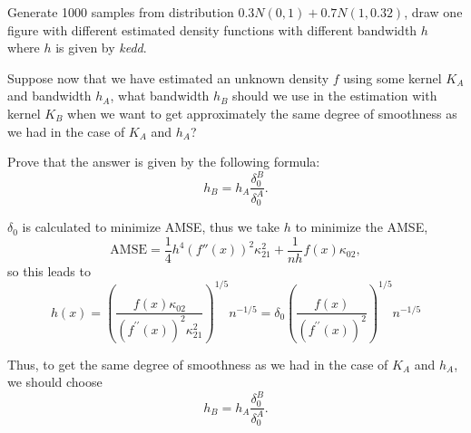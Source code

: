 \begin{problem}
    Generate 1000 samples from distribution $0.3N(0,1)+0.7N(1,0.32)$,  draw one figure with different estimated density functions with different bandwidth $h$ where $h$ is given by \emph{kedd}.
\end{problem}

\begin{problem}
    Suppose now that we have estimated an unknown density $f$ using some kernel $K_A$ and bandwidth $h_A$, what bandwidth $h_B$ should we use in the estimation with kernel $K_B$ when we want to get approximately the same degree of smoothness as we had in the case of $K_A$ and $h_A$?

    Prove that the answer is given by the following formula:
    \begin{equation*}
        h_B = h_A \frac{\delta_0^B}{\delta_0^A}.
    \end{equation*}
\end{problem}
\begin{solution}
    $\delta_0$ is calculated to minimize AMSE, thus we take $h$ to minimize the AMSE, 
    \begin{equation*}
        \text{AMSE} = \frac{1}{4}h^4 (f''(x))^2 \kappa_{21}^2 + \frac{1}{nh} f(x) \kappa_{02}, %
    \end{equation*}
    so this leads to 
    \begin{equation*}
        h(x)= \left(\frac{f(x) \kappa_{02}}{\left(f^{\prime \prime}(x)\right)^{2} \kappa_{21}^{2}}\right)^{1 / 5} n^{-1 / 5} = \delta_0 \left(\frac{f(x)}{\left(f^{\prime \prime}(x)\right)^{2} }\right)^{1 / 5}  n^{-1 / 5}
    \end{equation*}

    Thus, to get the same degree of smoothness as we had in the case of $K_A$ and $h_A$, we should choose
    \begin{equation*}
        h_B = h_A \frac{\delta_0^B}{\delta_0^A}.
    \end{equation*}

\end{solution}


